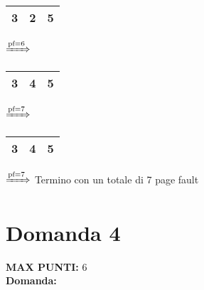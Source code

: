 \documentclass{article}
\begin{document}
\begin{itemize}
\begin{tabular}{|c|c|c|}
                3 & 2 & 5\\
                \hline
            \end{tabular}
            $\xRightarrow{\text{pf}=6}$
            \begin{tabular}{|c|c|c|}
                \hline
                3 & 4 & 5\\
                \hline
            \end{tabular}
            $\xRightarrow{\text{pf}=7}$
            \begin{tabular}{|c|c|c|}
                \hline
                3 & 4 & 5\\
                \hline
            \end{tabular}
            $\xRightarrow{\text{pf}=7}$
            Termino con un totale di 7 page fault
    \end{itemize}
    \section*{Domanda 4}
    \textbf{MAX PUNTI:} 6\\
    \textbf{Domanda:}
\end{document}
